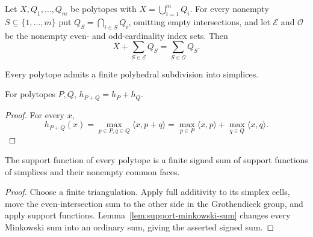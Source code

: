 \begin{lemma}
  \label{lem:full-additivity}
  \notready
  Let $X,Q_1,\ldots,Q_m$ be polytopes with $X=\bigcup_{i=1}^mQ_i$.  For every
  nonempty $S\subseteq\{1,\ldots,m\}$ put $Q_S=\bigcap_{i\in S}Q_i$, omitting
  empty intersections, and let $\mathcal E$ and $\mathcal O$ be the nonempty
  even- and odd-cardinality index sets.  Then
  \[
    X+\sum_{S\in\mathcal E}Q_S=\sum_{S\in\mathcal O}Q_S.
  \]
\end{lemma}

\begin{theorem}
  \label{thm:polytope-triangulation}
  \notready
  Every polytope admits a finite polyhedral subdivision into simplices.
\end{theorem}

\begin{lemma}
  \label{lem:support-minkowski-sum}
  For polytopes $P,Q$, $h_{P+Q}=h_P+h_Q$.
\end{lemma}
\begin{proof}
  For every $x$,
  \[
  h_{P+Q}(x)=\max_{p\in P,q\in Q}\langle x,p+q\rangle
   =\max_{p\in P}\langle x,p\rangle+
     \max_{q\in Q}\langle x,q\rangle.
  \]
\end{proof}

\begin{corollary}
  \label{cor:geometric-signed-simplex}
  The support function of every polytope is a finite signed sum of support
  functions of simplices and their nonempty common faces.
\end{corollary}
\begin{proof}
  Choose a finite triangulation.  Apply full additivity to its simplex cells,
  move the even-intersection sum to the other side in the Grothendieck group,
  and apply support functions.  Lemma~\ref{lem:support-minkowski-sum} changes
  every Minkowski sum into an ordinary sum, giving the asserted signed sum.
\end{proof}

